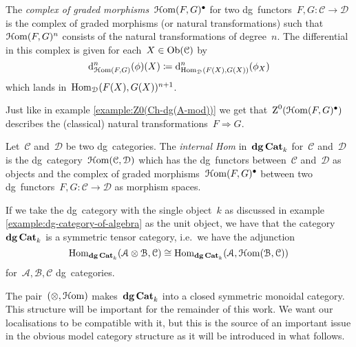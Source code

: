 \begin{refsection}
\begin{definition}
  The \emph{complex of graded morphisms}~$\operatorname{\mathcal{H}om}(F,G)^\bullet$ for two dg~functors~$F,G\colon\mathcal{C}\to\mathcal{D}$ is the complex of graded morphisms (or natural transformations) such that~$\operatorname{\mathcal{H}om}(F,G)^n$ consists of the natural transformations of degree~$n$. The differential in this complex is given for each~$X\in\operatorname{Ob}(\mathcal{C})$ by
  \begin{equation}
    \mathrm{d}_{\operatorname{\mathcal{H}om}(F,G)}^n(\phi)(X)\coloneqq\mathrm{d}_{\mathrm{Hom}_{\mathcal{D}}(F(X),G(X))}^n(\phi_X)
  \end{equation}
  which lands in~$\mathrm{Hom}_{\mathcal{D}}(F(X),G(X))^{n+1}$.
\end{definition}

\begin{example}
  Just like in example \ref{example:Z0(Ch-dg(A-mod))} we get that~$\operatorname{Z}^0(\operatorname{\mathcal{H}om}(F,G)^\bullet)$ describes the (classical) natural transformations~$F\Rightarrow G$.
\end{example}

\begin{definition}
  \label{definition:internal-Hom-dgCat}
  Let~$\mathcal{C}$ and~$\mathcal{D}$ be two dg~categories. The \emph{internal Hom} in~$\mathbf{dg\,Cat}_k$ for~$\mathcal{C}$ and~$\mathcal{D}$ is the dg~category~$\operatorname{\mathcal{H}om}(\mathcal{C},\mathcal{D})$ which has the dg~functors between~$\mathcal{C}$ and~$\mathcal{D}$ as objects and the complex of graded morphisms~$\operatorname{\mathcal{H}om}(F,G)^\bullet$ between two dg~functors~$F,G\colon\mathcal{C}\to\mathcal{D}$ as morphism spaces.
\end{definition}
If we take the dg~category with the single object~$k$ as discussed in example \ref{example:dg-category-of-algebra} as the unit object, we have that the category~$\mathbf{dg\,Cat}_k$ is a symmetric tensor category, i.e.\ we have the adjunction
\begin{equation}
  \mathrm{Hom}_{\mathbf{dg\,Cat}_k}(\mathcal{A}\otimes\mathcal{B},\mathcal{C})\cong\mathrm{Hom}_{\mathbf{dg\,Cat}_k}(\mathcal{A},\operatorname{\mathcal{H}om}(\mathcal{B},\mathcal{C}))
  \label{equation:tensor-Hom-Chk-adjunction}
\end{equation}
for~$\mathcal{A},\mathcal{B},\mathcal{C}$ dg~categories.

The pair~$(\otimes,\operatorname{\mathcal{H}om})$ makes~$\mathbf{dg\,Cat}_k$ into a closed symmetric monoidal category. This structure will be important for the remainder of this work. We want our localisations to be compatible with it, but this is the source of an important issue in the obvious model category structure as it will be introduced in what follows.



\end{refsection}
